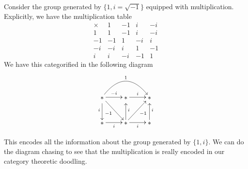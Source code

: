 Consider the group generated by $\{1,i=\sqrt{-1}\}$ equipped with
multiplication. Explicitly, we have the multiplication table
\begin{equation}%
\begin{array}{c|cccc}
\times & 1  & -1 & i  & -i\\\hline
1      & 1  & -1 & i  & -i \\
-1     & -1 & 1  & -i & i\\
-i     & -i & i  & 1  & -1\\
i      & i  & -i & -1 & 1 
\end{array}
\end{equation}
We have this categorified in the following diagram
\begin{equation}
\vcenter{
\xymatrix{            &                              & \\
\txt{*} \ar@/^2pc/[uurrdd]^{1}
\ar[d]_{i} \ar[dr]_{-1} \ar[r]^{-i} & \txt{*}               \ar[r]^{i} & \txt{*}  \\
\txt{*} \ar[r]_{i}            & \txt{*} \ar[r]_{i} \ar[u]_{i} \ar[ur]_{-1}& \txt{*} \ar[u]_{i}      }}
\end{equation}


This encodes all the information about the group generated by
$\{1,i\}$. We can do the diagram chasing to see that the
multiplication is really encoded in our category theoretic
doodling.

